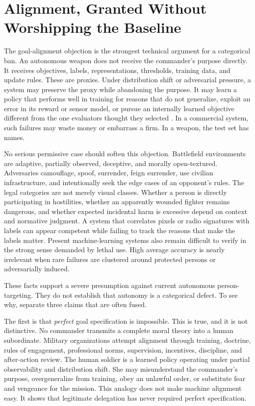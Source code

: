 \documentclass[11pt]{article}
\begin{document}
\section{Alignment, Granted Without Worshipping the Baseline}
\label{sec:alignment}

The goal-alignment objection is the strongest technical argument for a categorical ban. An autonomous weapon does not receive the commander's purpose directly. It receives objectives, labels, representations, thresholds, training data, and update rules. These are proxies. Under distribution shift or adversarial pressure, a system may preserve the proxy while abandoning the purpose. It may learn a policy that performs well in training for reasons that do not generalize, exploit an error in its reward or sensor model, or pursue an internally learned objective different from the one evaluators thought they selected \citep{amodei2016, hubinger2019, langosco2022}. In a commercial system, such failures may waste money or embarrass a firm. In a weapon, the test set has names.

No serious permissive case should soften this objection. Battlefield environments are adaptive, partially observed, deceptive, and morally open-textured. Adversaries camouflage, spoof, surrender, feign surrender, use civilian infrastructure, and intentionally seek the edge cases of an opponent's rules. The legal categories are not merely visual classes. Whether a person is directly participating in hostilities, whether an apparently wounded fighter remains dangerous, and whether expected incidental harm is excessive depend on context and normative judgment. A system that correlates pixels or radio signatures with labels can appear competent while failing to track the reasons that make the labels matter. Present machine-learning systems also remain difficult to verify in the strong sense demanded by lethal use. High average accuracy is nearly irrelevant when rare failures are clustered around protected persons or adversarially induced.

These facts support a severe presumption against current autonomous person-targeting. They do not establish that autonomy is a categorical defect. To see why, separate three claims that are often fused.

The first is that \emph{perfect} goal specification is impossible. This is true, and it is not distinctive. No commander transmits a complete moral theory into a human subordinate. Military organizations attempt alignment through training, doctrine, rules of engagement, professional norms, supervision, incentives, discipline, and after-action review. The human soldier is a learned policy operating under partial observability and distribution shift. She may misunderstand the commander's purpose, overgeneralize from training, obey an unlawful order, or substitute fear and vengeance for the mission. This analogy does not make machine alignment easy. It shows that legitimate delegation has never required perfect specification.
\end{document}
